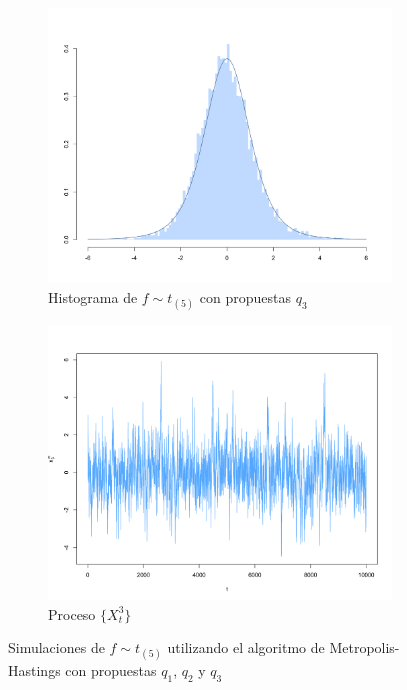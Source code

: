 \documentclass[11pt,a4paper]{article}
\begin{document}
\begin{figure}
     \vspace{0.2cm}
    
    \begin{subfigure}[t]{0.45\textwidth}
        \centering
        \includegraphics[width=\linewidth]{mh_hist_x3.png} 
        \caption{Histograma de $f \sim t_{(5)}$ con propuestas $q_3$} \label{fig:mh_hist_x3}
    \end{subfigure}
    \hfill
    \begin{subfigure}[t]{0.45\textwidth}
        \centering
        \includegraphics[width=\linewidth]{mh_chain_x3.png} 
        \caption{Proceso $\lbrace X_t^3 \rbrace$} \label{fig:mh_chain_x3}
    \end{subfigure}
    
    \caption{Simulaciones de $f \sim t_{(5)}$ utilizando el algoritmo de Metropolis-Hastings con propuestas $q_1$, $q_2$ y $q_3$}
    \label{fig:mh_t}
\end{figure}
\end{document}
